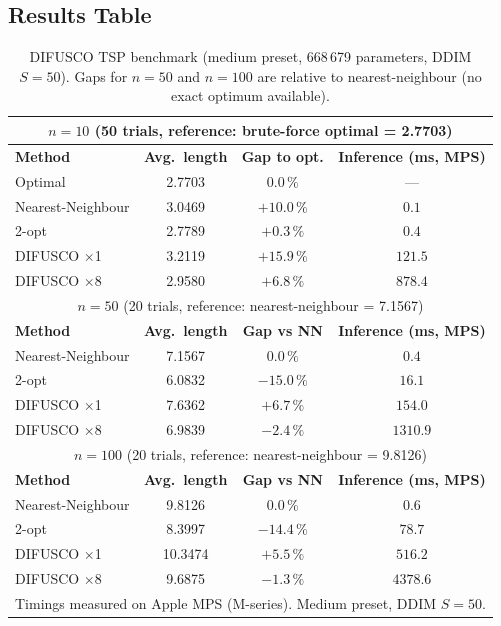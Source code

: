 \documentclass[12pt,a4paper]{article}
\begin{document}
\subsection*{Results Table}

\begin{table}[H]
\centering
{}
\begin{tabularx}{\linewidth}{Xccc}
\toprule
\multicolumn{4}{c}{$n = 10$ \quad (50 trials, reference: brute-force optimal = 2.7703)} \\
\midrule
\textbf{Method} & \textbf{Avg.\ length} & \textbf{Gap to opt.} & \textbf{Inference (ms, MPS)} \\
\midrule
Optimal           & 2.7703 & $0.0\,\%$   & --- \\
Nearest-Neighbour & 3.0469 & $+10.0\,\%$ & $0.1$ \\
2-opt             & 2.7789 & $+0.3\,\%$  & $0.4$ \\
DIFUSCO $\times$1 & 3.2119 & $+15.9\,\%$ & $121.5$ \\
DIFUSCO $\times$8 & 2.9580 & $+6.8\,\%$  & $878.4$ \\
\midrule
\multicolumn{4}{c}{$n = 50$ \quad (20 trials, reference: nearest-neighbour = 7.1567)} \\
\midrule
\textbf{Method} & \textbf{Avg.\ length} & \textbf{Gap vs NN} & \textbf{Inference (ms, MPS)} \\
\midrule
Nearest-Neighbour & 7.1567 & $0.0\,\%$   & $0.4$ \\
2-opt             & 6.0832 & $-15.0\,\%$ & $16.1$ \\
DIFUSCO $\times$1 & 7.6362 & $+6.7\,\%$  & $154.0$ \\
DIFUSCO $\times$8 & 6.9839 & $-2.4\,\%$  & $1310.9$ \\
\midrule
\multicolumn{4}{c}{$n = 100$ \quad (20 trials, reference: nearest-neighbour = 9.8126)} \\
\midrule
\textbf{Method} & \textbf{Avg.\ length} & \textbf{Gap vs NN} & \textbf{Inference (ms, MPS)} \\
\midrule
Nearest-Neighbour & 9.8126  & $0.0\,\%$   & $0.6$ \\
2-opt             & 8.3997  & $-14.4\,\%$ & $78.7$ \\
DIFUSCO $\times$1 & 10.3474 & $+5.5\,\%$  & $516.2$ \\
DIFUSCO $\times$8 & 9.6875  & $-1.3\,\%$  & $4378.6$ \\
\bottomrule
\multicolumn{4}{l}{\small Timings measured on Apple MPS (M-series). Medium preset, DDIM $S=50$.}\\
\end{tabularx}
\caption{DIFUSCO TSP benchmark (medium preset, 668\,679 parameters, DDIM $S=50$).
  Gaps for $n=50$ and $n=100$ are relative to nearest-neighbour (no exact optimum available).}
\label{tab:tsp_benchmark}
\end{table}
\end{document}
